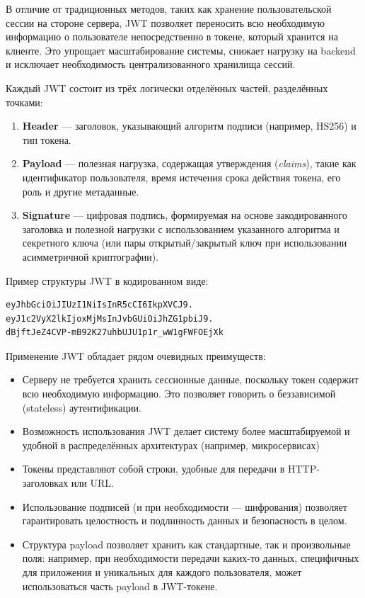 \documentclass[diploma]{SCWorks}
\begin{document}
В отличие от традиционных методов, таких как хранение пользовательской сессии 
на стороне сервера, JWT позволяет переносить всю необходимую информацию о 
пользователе непосредственно в токене, который хранится на клиенте. Это 
упрощает масштабирование системы, снижает нагрузку на backend и исключает 
необходимость централизованного хранилища сессий.

Каждый JWT состоит из трёх логически отделённых частей, разделённых точками:

\begin{enumerate}
    \item \textbf{Header} — заголовок, указывающий алгоритм подписи (например, 
    HS256) и тип токена.
    \item \textbf{Payload} — полезная нагрузка, содержащая утверждения 
    (\textit{claims}), такие как идентификатор пользователя, время истечения 
    срока действия токена, его роль и другие метаданные.
    \item \textbf{Signature} — цифровая подпись, формируемая на основе 
    закодированного заголовка и полезной нагрузки с использованием указанного 
    алгоритма и секретного ключа (или пары открытый/закрытый ключ при 
    использовании асимметричной криптографии).
\end{enumerate}

Пример структуры JWT в кодированном виде:

\begin{verbatim}
eyJhbGciOiJIUzI1NiIsInR5cCI6IkpXVCJ9.
eyJ1c2VyX2lkIjoxMjMsInJvbGUiOiJhZG1pbiJ9.
dBjftJeZ4CVP-mB92K27uhbUJU1p1r_wW1gFWFOEjXk
\end{verbatim}

Применение JWT обладает рядом очевидных преимуществ:

\begin{itemize}
    \item Серверу не требуется хранить сессионные данные, поскольку токен 
    содержит всю необходимую информацию. Это позволяет говорить о беззависимой
    (stateless) аутентификации.
    \item Возможность использования JWT делает систему более масштабируемой и 
    удобной в распределённых архитектурах (например, микросервисах)
    \item Токены представляют собой строки, удобные для передачи в 
    HTTP-заголовках или URL.
    \item Использование подписей (и при необходимости — шифрования) позволяет 
    гарантировать целостность и подлинность данных и безопасность в целом.
    \item Структура payload позволяет хранить как стандартные, так и 
    произвольные поля: например, при необходимости передачи каких-то данных, 
    специфичных для приложения и уникальных для каждого пользователя, может 
    использоваться часть payload в JWT-токене.
\end{itemize}
\end{document}
